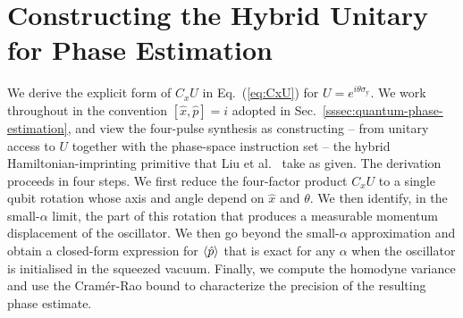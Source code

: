 \documentclass[aps,prx,showpacs,notitlepage,twocolumn,superscriptaddress,nofootinbib,preprintnumbers,floatfix,10pt, longbibliography]{revtex4-2}
\begin{document}
{\section{Constructing the Hybrid Unitary for Phase Estimation}
\label{app:phase-est}
We derive the explicit form of $C_xU$ in Eq.~(\ref{eq:CxU}) for
$U=e^{i\theta\sigma_\mathrm{y}}$. We work throughout in the convention
$[\hat{x},\hat{p}]=i$ adopted in Sec.~\ref{sssec:quantum-phase-estimation}, and view the four-pulse
synthesis as constructing -- from unitary access to $U$ together with
the phase-space instruction set -- the hybrid Hamiltonian-imprinting
primitive that Liu et al.~\cite{liu2016power} take as given. The
derivation proceeds in four steps. We first reduce the four-factor
product $C_xU$ to a single qubit rotation whose axis and angle depend
on $\hat{x}$ and $\theta$. We then identify, in the small-$\alpha$
limit, the part of this rotation that produces a measurable momentum
displacement of the oscillator. We then go beyond the small-$\alpha$
approximation and obtain a closed-form expression for $\braket{\hat{p}}$
that is exact for any $\alpha$ when the oscillator is initialised in
the squeezed vacuum. Finally, we compute the homodyne variance and
use the Cramér-Rao bound to characterize the precision of the
resulting phase estimate.

}
\end{document}
